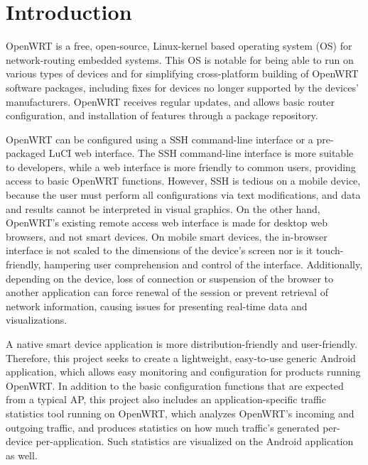 \section{Introduction}
	
OpenWRT is a free, open-source, Linux-kernel based operating system (OS) for network-routing embedded systems. This OS is notable for being able to run on various types of devices and for simplifying cross-platform building of OpenWRT software packages, including fixes for devices no longer supported by the devices' manufacturers. OpenWRT receives regular updates, and allows basic router configuration, and installation of features through a package repository.

OpenWRT can be configured using a SSH command-line interface or a pre-packaged LuCI web interface. The SSH command-line interface is more suitable to developers, while a web interface is more friendly to common users, providing access to basic OpenWRT functions. However, SSH is tedious on a mobile device, because the user must perform all configurations via text modifications, and data and results cannot be interpreted in visual graphics. On the other hand, OpenWRT's existing remote access web interface is made for desktop web browsers, and not smart devices. On mobile smart devices, the in-browser interface is not scaled to the dimensions of the device's screen nor is it touch-friendly, hampering user comprehension and control of the interface. Additionally, depending on the device, loss of connection or suspension of the browser to another application can force renewal of the session or prevent retrieval of network information, causing issues for presenting real-time data and visualizations.
	
A native smart device application is more distribution-friendly and user-friendly. Therefore, this project seeks to create a lightweight, easy-to-use generic Android application, which allows easy monitoring and configuration for products running OpenWRT. In addition to the basic configuration functions that are expected from a typical AP, this project also includes an application-specific traffic statistics tool running on OpenWRT, which analyzes OpenWRT's incoming and outgoing traffic, and produces statistics on how much traffic's generated per-device per-application. Such statistics are visualized on the Android application as well.